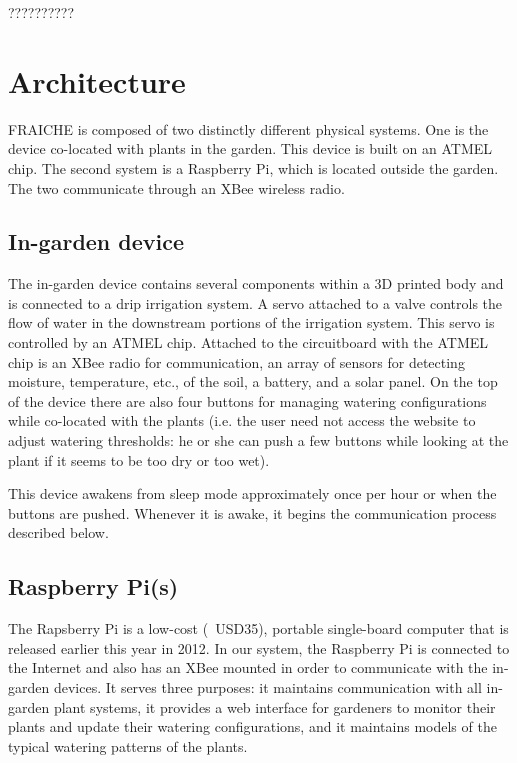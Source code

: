 \documentclass[a4paper]{acm_proc_article-sp}
\begin{document}
??????????

\section{Architecture}

FRAICHE is composed of two distinctly different physical systems.  One is the device co-located with plants in the garden.  This device is built on an ATMEL chip.  The second system is a Raspberry Pi, which is located outside the garden.  The two communicate through an XBee wireless radio.

\subsection{In-garden device}

The in-garden device contains several components within a 3D printed body and is connected to a drip irrigation system.  A servo attached to a valve controls the flow of water in the downstream portions of the irrigation system.  This servo is controlled by an ATMEL chip.  Attached to the circuitboard with the ATMEL chip is an XBee radio for communication, an array of sensors for detecting moisture, temperature, etc., of the soil, a battery, and a solar panel.  On the top of the device there are also four buttons for managing watering configurations while co-located with the plants (i.e. the user need not access the website to adjust watering thresholds: he or she can push a few buttons while looking at the plant if it seems to be too dry or too wet).

This device awakens from sleep mode approximately once per hour or when the buttons are pushed.  Whenever it is awake, it begins the communication process described below.

\subsection{Raspberry Pi(s)}

The Rapsberry Pi is a low-cost (~USD35), portable single-board computer that is released earlier this year in 2012. In our system, the Raspberry Pi is connected to the Internet and also has an XBee mounted in order to communicate with the in-garden devices.  It serves three purposes: it maintains communication with all in-garden plant systems, it provides a web interface for gardeners to monitor their plants and update their watering configurations, and it maintains models of the typical watering patterns of the plants.
\end{document}
